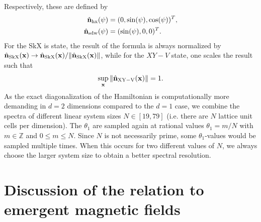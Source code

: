 \documentclass[
    10pt,
    aps,
    prb,
    twocolumn,
    floatfix,
    superscriptaddress,
]{revtex4-2}
\begin{document}
Respectively, these are defined by
\begin{align}
\hat{\mathbf{n}}_\mathrm{hx} (\psi) &=  (0, \sin(\psi), \cos(\psi))^T,
\\
\hat{\mathbf{n}}_\mathrm{sdw} (\psi) &=  (\sin(\psi),0,0)^T .
\end{align}
For the SkX is state, the result of the formula is always normalized by
$\hat{\mathbf{n}}_\mathrm{SkX}(\mathbf{x}) \to \hat{\mathbf{n}}_\mathrm{SkX}(\mathbf{x}) / \| \hat{\mathbf{n}}_\mathrm{SkX}(\mathbf{x})\| $, while for the $XY-V$ state, one scales the result such that
\begin{equation}
	\sup_{\mathbf{x}} \| 	\hat{\mathbf{n}}_\mathrm{XY-V}(\mathbf{x}) \| = 1.
\end{equation}	
As the exact diagonalization of the Hamiltonian is computationally more demanding in $d=2$ dimensions compared to the $d=1$ case, we combine the spectra of different linear system sizes $N\in[19, 79]$ (i.e. there are $N$ lattice unit cells per dimension).
The $\theta_1$ are sampled again at rational values $\theta_1 = m /N $ with $m \in \mathbb{Z}$ and $ 0\leq m \leq N$.
Since $N$ is not necessarily prime, some $\theta_1$-values would be sampled multiple times.
When this occurs for two different values of $N$, we always choose the larger system size to obtain a better spectral resolution. 


\section{Discussion of the relation to emergent magnetic fields}
\label{app:emergent_magnetic_fields}
\end{document}
